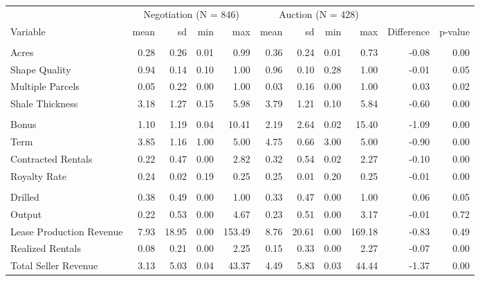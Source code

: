 
\begin{tabular}{lrrrrrrrrrr}
\toprule
\multicolumn{1}{c}{ } & \multicolumn{4}{c}{Negotiation (N = 846)} & \multicolumn{4}{c}{Auction (N = 428)} \\
\cmidrule(l{3pt}r{3pt}){2-5} \cmidrule(l{3pt}r{3pt}){6-9}
Variable & mean & sd & min & max & mean & sd & min & max & Difference & p-value\\
\midrule
\addlinespace[0.3em]
\multicolumn{11}{l}{\textbf{Land Characteristics}}\\
\hspace{1em}Acres & 0.28 & 0.26 & 0.01 & 0.99 & 0.36 & 0.24 & 0.01 & 0.73 & -0.08 & 0.00\\
\hspace{1em}Shape Quality & 0.94 & 0.14 & 0.10 & 1.00 & 0.96 & 0.10 & 0.28 & 1.00 & -0.01 & 0.05\\
\hspace{1em}Multiple Parcels & 0.05 & 0.22 & 0.00 & 1.00 & 0.03 & 0.16 & 0.00 & 1.00 & 0.03 & 0.02\\
\hspace{1em}Shale Thickness & 3.18 & 1.27 & 0.15 & 5.98 & 3.79 & 1.21 & 0.10 & 5.84 & -0.60 & 0.00\\
\addlinespace[0.3em]
\multicolumn{11}{l}{\textbf{Lease Characteristics}}\\
\hspace{1em}Bonus & 1.10 & 1.19 & 0.04 & 10.41 & 2.19 & 2.64 & 0.02 & 15.40 & -1.09 & 0.00\\
\hspace{1em}Term & 3.85 & 1.16 & 1.00 & 5.00 & 4.75 & 0.66 & 3.00 & 5.00 & -0.90 & 0.00\\
\hspace{1em}Contracted Rentals & 0.22 & 0.47 & 0.00 & 2.82 & 0.32 & 0.54 & 0.02 & 2.27 & -0.10 & 0.00\\
\hspace{1em}Royalty Rate & 0.24 & 0.02 & 0.19 & 0.25 & 0.25 & 0.01 & 0.20 & 0.25 & -0.01 & 0.00\\
\addlinespace[0.3em]
\multicolumn{11}{l}{\textbf{Lease Outcomes}}\\
\hspace{1em}Drilled & 0.38 & 0.49 & 0.00 & 1.00 & 0.33 & 0.47 & 0.00 & 1.00 & 0.06 & 0.05\\
\hspace{1em}Output & 0.22 & 0.53 & 0.00 & 4.67 & 0.23 & 0.51 & 0.00 & 3.17 & -0.01 & 0.72\\
\hspace{1em}Lease Production Revenue & 7.93 & 18.95 & 0.00 & 153.49 & 8.76 & 20.61 & 0.00 & 169.18 & -0.83 & 0.49\\
\hspace{1em}Realized Rentals & 0.08 & 0.21 & 0.00 & 2.25 & 0.15 & 0.33 & 0.00 & 2.27 & -0.07 & 0.00\\
\hspace{1em}Total Seller Revenue & 3.13 & 5.03 & 0.04 & 43.37 & 4.49 & 5.83 & 0.03 & 44.44 & -1.37 & 0.00\\
\bottomrule
\end{tabular}
